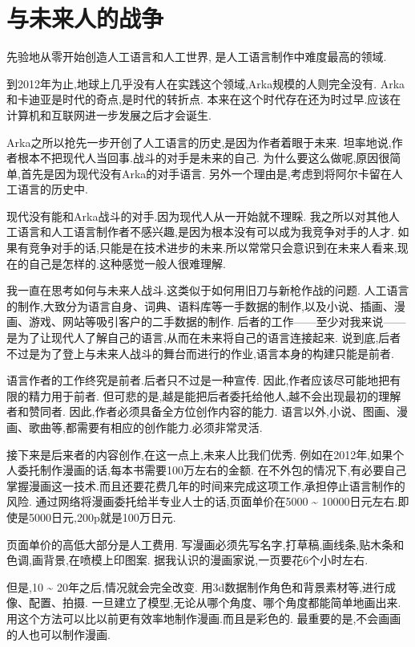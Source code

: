 \chapter{与未来人的战争}
先验地从零开始创造人工语言和人工世界,
是人工语言制作中难度最高的领域.

到2012年为止,地球上几乎没有人在实践这个领域,Arka规模的人则完全没有.
Arka和卡迪亚是时代的奇点,是时代的转折点.
本来在这个时代存在还为时过早.应该在计算机和互联网进一步发展之后才会诞生.

Arka之所以抢先一步开创了人工语言的历史,是因为作者着眼于未来.
坦率地说,作者根本不把现代人当回事.战斗的对手是未来的自己.
为什么要这么做呢,原因很简单,首先是因为现代没有Arka的对手语言.
另外一个理由是,考虑到将阿尔卡留在人工语言的历史中.

现代没有能和Arka战斗的对手.因为现代人从一开始就不理睬.
我之所以对其他人工语言和人工语言制作者不感兴趣,是因为根本没有可以成为我竞争对手的人才.
如果有竞争对手的话,只能是在技术进步的未来.所以常常只会意识到在未来人看来,现在的自己是怎样的.这种感觉一般人很难理解.

我一直在思考如何与未来人战斗.这类似于如何用旧刀与新枪作战的问题.
人工语言的制作,大致分为语言自身、词典、语料库等一手数据的制作,以及小说、插画、漫画、游戏、网站等吸引客户的二手数据的制作.
后者的工作——至少对我来说——是为了让现代人了解自己的语言,从而在未来将自己的语言连接起来.
说到底,后者不过是为了登上与未来人战斗的舞台而进行的作业,语言本身的构建只能是前者.

语言作者的工作终究是前者.后者只不过是一种宣传.
因此,作者应该尽可能地把有限的精力用于前者.
但可悲的是,越是能把后者委托给他人,越不会出现最初的理解者和赞同者.
因此,作者必须具备全方位创作内容的能力.
语言以外,小说、图画、漫画、歌曲等,都需要有相应的创作能力.必须非常灵活.

接下来是后来者的内容创作,在这一点上,未来人比我们优秀.
例如在2012年,如果个人委托制作漫画的话,每本书需要100万左右的金额.
在不外包的情况下,有必要自己掌握漫画这一技术.而且还要花费几年的时间来完成这项工作,承担停止语言制作的风险.
通过网络将漫画委托给半专业人士的话,页面单价在5000 \~{} 10000日元左右.即使是5000日元,200p就是100万日元.

页面单价的高低大部分是人工费用.
写漫画必须先写名字,打草稿,画线条,贴木条和色调,画背景,在喷模上印图案.
据我认识的漫画家说,一页要花6个小时左右.

但是,10 \~{} 20年之后,情况就会完全改变.
用3d数据制作角色和背景素材等,进行成像、配置、拍摄.
一旦建立了模型,无论从哪个角度、哪个角度都能简单地画出来.
用这个方法可以比以前更有效率地制作漫画.而且是彩色的.
最重要的是,不会画画的人也可以制作漫画.

